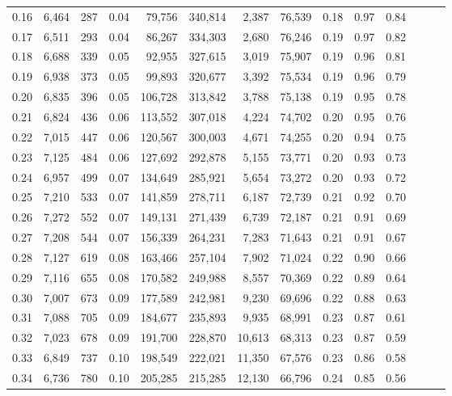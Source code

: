 \begin{tabular}{rrrrrrrrrrrrrr}
0.16 &  6,464 &    287 &  0.04 &   79,756 &  340,814 &   2,387 &  76,539 &  0.18 &  0.97 &      0.84 \\
0.17 &  6,511 &    293 &  0.04 &   86,267 &  334,303 &   2,680 &  76,246 &  0.19 &  0.97 &      0.82 \\
0.18 &  6,688 &    339 &  0.05 &   92,955 &  327,615 &   3,019 &  75,907 &  0.19 &  0.96 &      0.81 \\
0.19 &  6,938 &    373 &  0.05 &   99,893 &  320,677 &   3,392 &  75,534 &  0.19 &  0.96 &      0.79 \\
0.20 &  6,835 &    396 &  0.05 &  106,728 &  313,842 &   3,788 &  75,138 &  0.19 &  0.95 &      0.78 \\
0.21 &  6,824 &    436 &  0.06 &  113,552 &  307,018 &   4,224 &  74,702 &  0.20 &  0.95 &      0.76 \\
0.22 &  7,015 &    447 &  0.06 &  120,567 &  300,003 &   4,671 &  74,255 &  0.20 &  0.94 &      0.75 \\
0.23 &  7,125 &    484 &  0.06 &  127,692 &  292,878 &   5,155 &  73,771 &  0.20 &  0.93 &      0.73 \\
0.24 &  6,957 &    499 &  0.07 &  134,649 &  285,921 &   5,654 &  73,272 &  0.20 &  0.93 &      0.72 \\
0.25 &  7,210 &    533 &  0.07 &  141,859 &  278,711 &   6,187 &  72,739 &  0.21 &  0.92 &      0.70 \\
0.26 &  7,272 &    552 &  0.07 &  149,131 &  271,439 &   6,739 &  72,187 &  0.21 &  0.91 &      0.69 \\
0.27 &  7,208 &    544 &  0.07 &  156,339 &  264,231 &   7,283 &  71,643 &  0.21 &  0.91 &      0.67 \\
0.28 &  7,127 &    619 &  0.08 &  163,466 &  257,104 &   7,902 &  71,024 &  0.22 &  0.90 &      0.66 \\
0.29 &  7,116 &    655 &  0.08 &  170,582 &  249,988 &   8,557 &  70,369 &  0.22 &  0.89 &      0.64 \\
0.30 &  7,007 &    673 &  0.09 &  177,589 &  242,981 &   9,230 &  69,696 &  0.22 &  0.88 &      0.63 \\
0.31 &  7,088 &    705 &  0.09 &  184,677 &  235,893 &   9,935 &  68,991 &  0.23 &  0.87 &      0.61 \\
0.32 &  7,023 &    678 &  0.09 &  191,700 &  228,870 &  10,613 &  68,313 &  0.23 &  0.87 &      0.59 \\
0.33 &  6,849 &    737 &  0.10 &  198,549 &  222,021 &  11,350 &  67,576 &  0.23 &  0.86 &      0.58 \\
0.34 &  6,736 &    780 &  0.10 &  205,285 &  215,285 &  12,130 &  66,796 &  0.24 &  0.85 &      0.56 \\

\end{tabular}
